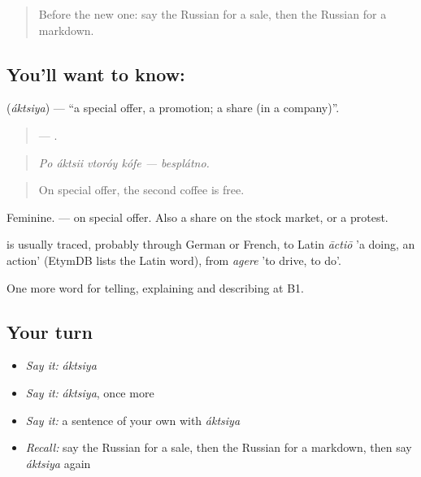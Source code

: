 \label{lesson:RU-C454-aktsiya}



\begin{quote}
Before the new one: say the Russian for a sale, then the Russian for a markdown.
\end{quote}

\subsection*{You'll want to know: }
\textbf{} (\emph{áktsiya}) — \textquotedblleft{}a special offer, a promotion; a share (in a company)\textquotedblright{}.

\begin{quote}
    — .
\end{quote}

\begin{quote}
\emph{Po áktsii vtoróy kófe — besplátno.}
\end{quote}

\begin{quote}
On special offer, the second coffee is free.
\end{quote}

Feminine. \emph{ } — on special offer. Also a share on the stock market, or a protest.

\begin{cousinweb}
\emph{} is usually traced, probably through German or French, to Latin \emph{āctiō} 'a doing, an action' (EtymDB lists the Latin word), from \emph{agere} 'to drive, to do'.
\end{cousinweb}

\begin{grammarlens}[title={What you've built}]
One more word for telling, explaining and describing at B1.
\end{grammarlens}

\subsection*{Your turn}
\begin{itemize}
\raggedright
  \item \emph{Say it:} \emph{áktsiya}
  \item \emph{Say it:} \emph{áktsiya}, once more
  \item \emph{Say it:} a sentence of your own with \emph{áktsiya}
  \item \emph{Recall:} say the Russian for a sale, then the Russian for a markdown, then say \emph{áktsiya} again
\end{itemize}

